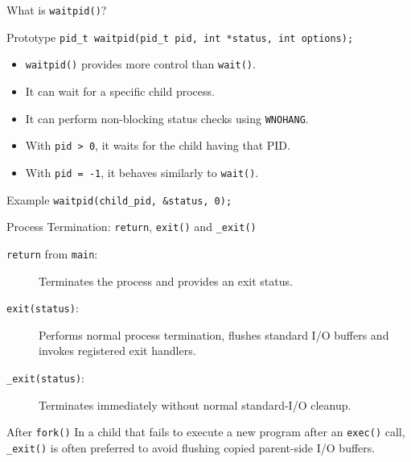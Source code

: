 \documentclass[aspectratio=169]{beamer}
\begin{document}
\begin{frame}{What is \texttt{waitpid()}?}

\begin{block}{Prototype}
\centering
\texttt{pid\_t waitpid(pid\_t pid, int *status, int options);}
\end{block}

\begin{itemize}
    \item \texttt{waitpid()} provides more control than \texttt{wait()}.
    \item It can wait for a specific child process.
    \item It can perform non-blocking status checks using \texttt{WNOHANG}.
    \item With \texttt{pid > 0}, it waits for the child having that PID.
    \item With \texttt{pid = -1}, it behaves similarly to \texttt{wait()}.
\end{itemize}

\begin{exampleblock}{Example}
\centering
\texttt{waitpid(child\_pid, \&status, 0);}
\end{exampleblock}

\end{frame}

\begin{frame}{Process Termination: \texttt{return}, \texttt{exit()} and \texttt{\_exit()}}

\begin{description}
    \item[\texttt{return} from \texttt{main}:]
    Terminates the process and provides an exit status.

    \item[\texttt{exit(status)}:]
    Performs normal process termination, flushes standard I/O buffers and invokes
    registered exit handlers.

    \item[\texttt{\_exit(status)}:]
    Terminates immediately without normal standard-I/O cleanup.
\end{description}

\begin{alertblock}{After \texttt{fork()}}
In a child that fails to execute a new program after an \texttt{exec()} call,
\texttt{\_exit()} is often preferred to avoid flushing copied parent-side I/O
buffers.
\end{alertblock}

\end{frame}
\end{document}
